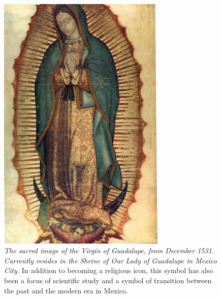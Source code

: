 \documentclass[10pt]{article}
\begin{document}
\begin{figure}[hb]
\centering
\includegraphics[width=8cm]{virgen.jpg}
\caption{\textit{The sacred image of the Virgin of Guadalupe, from December 1531.  Currently resides in the Shrine of Our Lady of Guadalupe in Mexico City.}  In addition to becoming a religious icon, this symbol has also been a focus of scientific study and a symbol of transition between the past and the modern era in Mexico.}
\end{figure}
\end{document}
